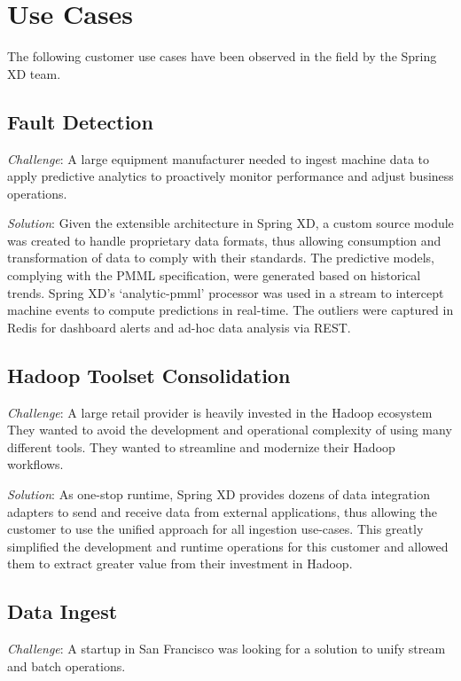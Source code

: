 \section{Use Cases}
\label{sec:Use Cases}

The following customer use cases have been observed in the field by the Spring XD team.

\subsection{Fault Detection}
\textit{Challenge}: A large equipment manufacturer needed to
ingest machine data to apply predictive analytics to proactively monitor
performance and adjust business operations.

\textit{Solution}: Given the extensible architecture in Spring XD, a custom
source module was created to handle proprietary data formats, thus allowing
consumption and transformation of data to comply with their
standards. The predictive models, complying with the PMML specification, were
generated based on historical trends. Spring XD's `analytic-pmml' processor was
used in a stream to intercept machine events to compute predictions in
real-time. The outliers were captured in Redis for dashboard alerts
and ad-hoc data analysis via REST.

\subsection{Hadoop Toolset Consolidation}

\textit{Challenge}: A large retail provider is heavily invested in the Hadoop ecosystem
They wanted to avoid the development and operational complexity of using many
different tools. They wanted to streamline and modernize their Hadoop workflows.

\textit{Solution}: As one-stop runtime, Spring XD provides dozens of data integration
adapters to send and receive data from external applications, thus allowing
the customer to use the unified approach for all ingestion use-cases. This
greatly simplified the development and runtime operations for this customer
and allowed them to extract greater value from their investment in Hadoop.

\subsection{Data Ingest}
\textit{Challenge}: A startup in San Francisco was looking for a solution to
unify stream and batch operations.

